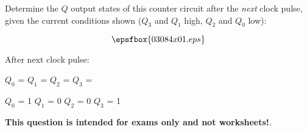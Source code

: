

Determine the $Q$ output states of this counter circuit after the {\it next} clock pulse, given the current conditions shown ($Q_3$ and $Q_1$ high, $Q_2$ and $Q_0$ low):

$$\epsfbox{03084x01.eps}$$

After next clock pulse:

\vskip 10pt

$Q_0$ = \hskip 50pt $Q_1$ = \hskip 50pt $Q_2$ = \hskip 50pt $Q_3$ =







$Q_0$ = 1 \hskip 50pt $Q_1$ = 0 \hskip 50pt $Q_2$ = 0 \hskip 50pt $Q_3$ = 1







{\bf This question is intended for exams only and not worksheets!}.




